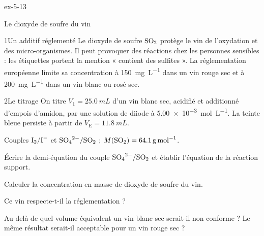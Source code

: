 \begin{blocLivre}{ex-5-13}
\begin{exercice}[3]{Le dioxyde de soufre du vin}
\begin{docu}{1}{Un additif réglementé}
Le dioxyde de soufre $\ce{SO2}$ protège le vin de l'oxydation et des micro-organismes. Il peut provoquer des réactions chez
les personnes sensibles : les étiquettes portent la mention « contient des sulfites ». La réglementation européenne limite
sa concentration à \qty{150}{mg.L^{-1}} dans un vin rouge sec et à \qty{200}{mg.L^{-1}} dans un vin blanc ou rosé sec.
\end{docu}
\begin{docu}{2}{Le titrage}
On titre $V_1=\qty{25,0}{mL}$ d'un vin blanc sec, acidifié et additionné d'empois d'amidon, par une solution de diiode à
\qty{5,00e-3}{mol.L^{-1}}. La teinte bleue persiste à partir de $V_\mathrm{E}=\qty{11,8}{mL}$.
\end{docu}
\begin{donnees}
Couples $\ce{I2}/\ce{I-}$ et $\ce{SO4^{2-}}/\ce{SO2}$ ; $M(\ce{SO2})=\qty{64,1}{g.mol^{-1}}$.
\end{donnees}
\begin{questions}
\item Écrire la demi-équation du couple $\ce{SO4^{2-}}/\ce{SO2}$ et établir l'équation de la réaction support.
\item Calculer la concentration en masse de dioxyde de soufre du vin.
\item Ce vin respecte-t-il la réglementation ?
\item \initiative Au-delà de quel volume équivalent un vin blanc sec serait-il non conforme ? Le même résultat serait-il
acceptable pour un vin rouge sec ?
\end{questions}
\end{exercice}
\end{blocLivre}
